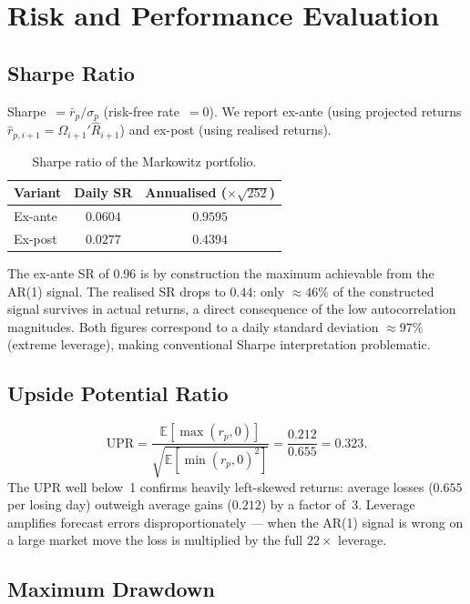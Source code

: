 \documentclass[10pt, a4paper]{article}
\begin{document}
\section{Risk and Performance Evaluation}

\subsection{Sharpe Ratio}

Sharpe~$= \bar{r}_p / \sigma_p$ (risk-free rate~$= 0$). We report ex-ante (using
projected returns $\hat{r}_{p,i+1} = \Omega_{i+1}'\hat{R}_{i+1}$) and ex-post
(using realised returns).

\begin{table}[H]
\centering
\caption{Sharpe ratio of the Markowitz portfolio.}
\label{tab:sharpe}
\small
\begin{tabular}{lcc}
\toprule
Variant & Daily SR & Annualised ($\times\!\sqrt{252}$) \\
\midrule
Ex-ante  & $0.0604$ & $0.9595$ \\
Ex-post  & $0.0277$ & $0.4394$ \\
\bottomrule
\end{tabular}
\end{table}

The ex-ante SR of $0.96$ is by construction the maximum achievable from the AR(1)
signal. The realised SR drops to $0.44$: only $\approx 46\%$ of the constructed
signal survives in actual returns, a direct consequence of the low autocorrelation
magnitudes. Both figures correspond to a daily standard deviation $\approx 97\%$
(extreme leverage), making conventional Sharpe interpretation problematic.

\subsection{Upside Potential Ratio}

\[
  \mathrm{UPR}
  = \frac{\mathbb{E}[\max(r_p,0)]}{\sqrt{\mathbb{E}[\min(r_p,0)^2]}}
  = \frac{0.212}{0.655} = 0.323.
\]
The UPR well below~1 confirms heavily left-skewed returns: average losses ($0.655$
per losing day) outweigh average gains ($0.212$) by a factor of~3. Leverage amplifies
forecast errors disproportionately — when the AR(1) signal is wrong on a large
market move the loss is multiplied by the full $22\times$ leverage.

\subsection{Maximum Drawdown}
\end{document}

